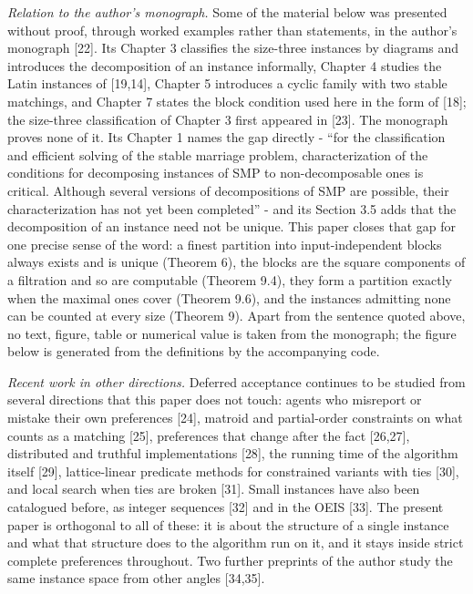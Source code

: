 \documentclass[
  11pt,
]{article}
\begin{document}
\emph{Relation to the author's monograph.} Some of the material below
was presented without proof, through worked examples rather than
statements, in the author's monograph {[}22{]}. Its Chapter 3 classifies
the size-three instances by diagrams and introduces the decomposition of
an instance informally, Chapter 4 studies the Latin instances of
{[}19,14{]}, Chapter 5 introduces a cyclic family with two stable
matchings, and Chapter 7 states the block condition used here in the
form of {[}18{]}; the size-three classification of Chapter 3 first
appeared in {[}23{]}. The monograph proves none of it. Its Chapter 1
names the gap directly - ``for the classification and efficient solving
of the stable marriage problem, characterization of the conditions for
decomposing instances of SMP to non-decomposable ones is critical.
Although several versions of decompositions of SMP are possible, their
characterization has not yet been completed'' - and its Section 3.5 adds
that the decomposition of an instance need not be unique. This paper
closes that gap for one precise sense of the word: a finest partition
into input-independent blocks always exists and is unique (Theorem 6),
the blocks are the square components of a filtration and so are
computable (Theorem 9.4), they form a partition exactly when the maximal
ones cover (Theorem 9.6), and the instances admitting none can be
counted at every size (Theorem 9). Apart from the sentence quoted above,
no text, figure, table or numerical value is taken from the monograph;
the figure below is generated from the definitions by the accompanying
code.

\emph{Recent work in other directions.} Deferred acceptance continues to
be studied from several directions that this paper does not touch:
agents who misreport or mistake their own preferences {[}24{]}, matroid
and partial-order constraints on what counts as a matching {[}25{]},
preferences that change after the fact {[}26,27{]}, distributed and
truthful implementations {[}28{]}, the running time of the algorithm
itself {[}29{]}, lattice-linear predicate methods for constrained
variants with ties {[}30{]}, and local search when ties are broken
{[}31{]}. Small instances have also been catalogued before, as integer
sequences {[}32{]} and in the OEIS {[}33{]}. The present paper is
orthogonal to all of these: it is about the structure of a single
instance and what that structure does to the algorithm run on it, and it
stays inside strict complete preferences throughout. Two further
preprints of the author study the same instance space from other angles
{[}34,35{]}.
\end{document}
